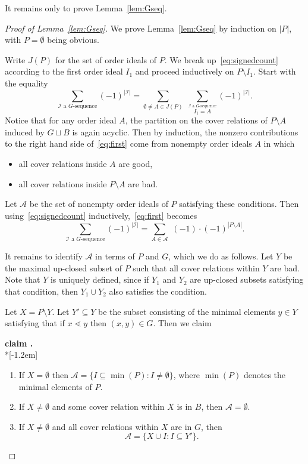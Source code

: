 \documentclass[11pt]{article}
\theoremstyle{definition}
\newenvironment{enonce}[1]{\refstepcounter{theorem}\par\medskip\noindent\textbf{#1 \thetheorem.}\ }{\par\medskip}
\begin{document}
It remains only to prove Lemma~\ref{lem:Gseq}.
\begin{proof}[Proof of Lemma~\ref{lem:Gseq}] We prove Lemma~\ref{lem:Gseq} by induction on $|P|$, with $P=\emptyset$ being obvious. 

Write $J(P)$ for the set of order ideals of $P$. 
We break up~\eqref{eq:signedcount} according to the first order ideal $I_1$ and proceed inductively on $P\setminus I_1$. Start with the equality
\begin{equation}\label{eq:first}
\sum_\text{$\mathcal{I}$ a $G$-sequence} \! (-1)^{|\mathcal{I}|} = \sum_{\emptyset\ne A \in J(P)} \,\,\sum_{\stackrel{\text{$\mathcal{I}$ a $G$-sequence}}{I_1=A}} (-1)^{|\mathcal{I}|}.
\end{equation}
Notice that for any order ideal $A$, the partition on the cover relations of $P\setminus A$ induced by $G\sqcup B$ is again acyclic. Then by induction, the nonzero contributions to the right hand side of~\eqref{eq:first} come from nonempty order ideals $A$ in which 
\begin{itemize}
\item all cover relations inside $A$ are good,
\item all cover relations inside $P\setminus A$ are bad.
\end{itemize}

Let $\mathcal{A}$ be the set of nonempty order ideals of $P$ satisfying these conditions. Then using~\eqref{eq:signedcount} inductively,~\eqref{eq:first} becomes
\begin{equation}\label{eq:second}
\sum_\text{$\mathcal{I}$ a $G$-sequence} \! (-1)^{|\mathcal{I}|} = \sum_{A\in \mathcal{A}} \,\,(-1)\cdot (-1)^{|P\setminus A|}.
\end{equation}

It remains to identify $\mathcal{A}$ in terms of $P$ and $G$, which we do as follows. Let $Y$ be the maximal up-closed subset of $P$ such that all cover relations within $Y$ are bad. Note that $Y$ is uniquely defined, since if $Y_1$ and $Y_2$ are up-closed subsets satisfying that condition, then $Y_1\cup Y_2$ also satisfies the condition. 

Let $X = P\setminus Y$. Let $Y'\subseteq Y$ be the subset consisting of the minimal elements $y\in Y$ satisfying that if $x\lessdot y$ then $(x,y)\in G$. 
Then we claim 
\begin{enonce}{claim}\label{c:A}\ \\*[-1.2em]
\begin{enumerate}
\item\label{claim3.20_1} If $X = \emptyset$ then $\mathcal{A} = \{I \subseteq \min(P): I\ne \emptyset\}$, where $\min(P)$ denotes the minimal elements of $P$.
\item\label{claim3.20_2} If $X\ne \emptyset$ and some cover relation within $X$ is in $B$, then $\mathcal{A}=\emptyset$.
\item\label{claim3.20_3} If $X\ne \emptyset$ and all cover relations within $X$ are in $G$, then
\[
\mathcal{A} = \{X\cup I: I\subseteq Y'\}.
\]
\end{enumerate}
\end{enonce}



\end{proof}
\end{document}
